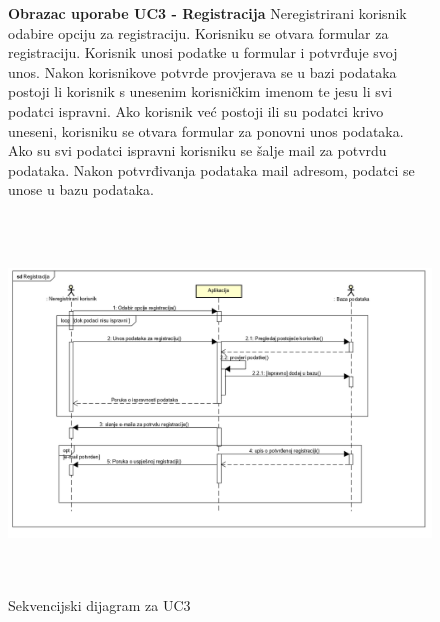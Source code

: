 				\begin{figure}[H]
					\textbf{Obrazac uporabe UC3 - Registracija} 
					\newline
					\newline
					Neregistrirani korisnik odabire opciju za registraciju. Korisniku se otvara formular za registraciju. Korisnik unosi podatke u formular i potvrđuje svoj unos. Nakon korisnikove potvrde provjerava se u bazi podataka postoji li korisnik s unesenim korisničkim imenom te jesu li svi podatci ispravni. Ako korisnik već postoji ili su podatci krivo uneseni, korisniku se otvara formular za ponovni unos podataka. Ako su svi podatci ispravni korisniku se šalje mail za potvrdu podataka. Nakon potvrđivanja podataka mail adresom, podatci se unose u bazu podataka. \par
					\includegraphics[width=170mm,height=100mm]{slike/Reg.png} 
					\newline
					\centering
					\caption{Sekvencijski dijagram za UC3}
					\label{fig:promjene}
				\end{figure}

